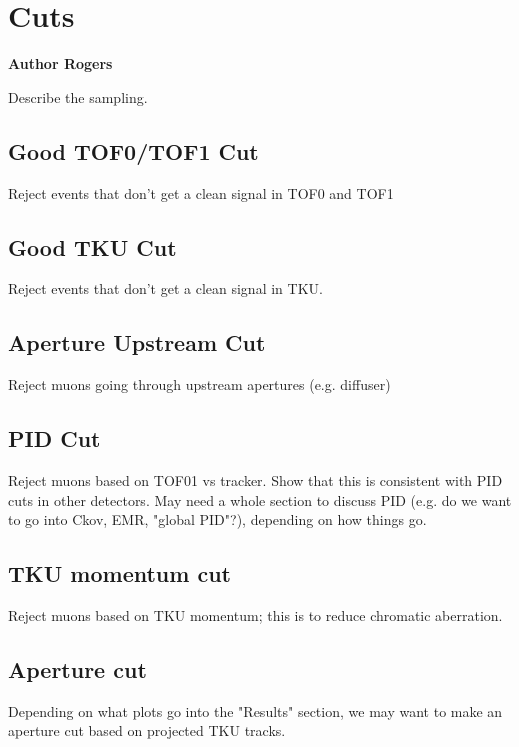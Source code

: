 \section{Cuts}

\textbf{Author Rogers}

Describe the sampling.

\subsection{Good TOF0/TOF1 Cut}

Reject events that don't get a clean signal in TOF0 and TOF1

\subsection{Good TKU Cut}

Reject events that don't get a clean signal in TKU.

\subsection{Aperture Upstream Cut}

Reject muons going through upstream apertures (e.g. diffuser)

\subsection{PID Cut}

Reject muons based on TOF01 vs tracker. Show that this is consistent with PID
cuts in other detectors. May need a whole section to discuss PID (e.g. 
do we want to go into Ckov, EMR, "global PID"?), depending on how things go.

\subsection{TKU momentum cut}

Reject muons based on TKU momentum; this is to reduce chromatic aberration.

\subsection{Aperture cut}

Depending on what plots go into the "Results" section, we may want to make an
aperture cut based on projected TKU tracks.





